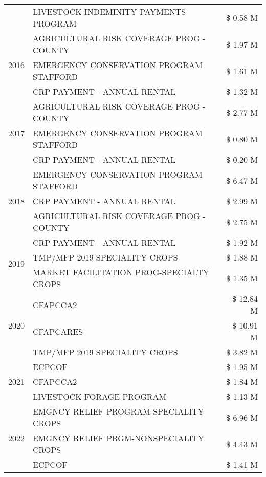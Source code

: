 \begin{tabular}{llr}
 & LIVESTOCK INDEMINITY PAYMENTS PROGRAM & \$ 0.58 M \\
\cline{1-3}
\multirow[t]{3}{*}{2016} & AGRICULTURAL RISK COVERAGE PROG - COUNTY & \$ 1.97 M \\
 & EMERGENCY CONSERVATION PROGRAM STAFFORD & \$ 1.61 M \\
 & CRP PAYMENT - ANNUAL RENTAL & \$ 1.32 M \\
\cline{1-3}
\multirow[t]{3}{*}{2017} & AGRICULTURAL RISK COVERAGE PROG - COUNTY & \$ 2.77 M \\
 & EMERGENCY CONSERVATION PROGRAM STAFFORD & \$ 0.80 M \\
 & CRP PAYMENT - ANNUAL RENTAL & \$ 0.20 M \\
\cline{1-3}
\multirow[t]{3}{*}{2018} & EMERGENCY CONSERVATION PROGRAM STAFFORD & \$ 6.47 M \\
 & CRP PAYMENT - ANNUAL RENTAL & \$ 2.99 M \\
 & AGRICULTURAL RISK COVERAGE PROG - COUNTY & \$ 2.75 M \\
\cline{1-3}
\multirow[t]{3}{*}{2019} & CRP PAYMENT - ANNUAL RENTAL & \$ 1.92 M \\
 & TMP/MFP 2019 SPECIALITY CROPS & \$ 1.88 M \\
 & MARKET FACILITATION PROG-SPECIALTY CROPS & \$ 1.35 M \\
\cline{1-3}
\multirow[t]{3}{*}{2020} & CFAPCCA2 & \$ 12.84 M \\
 & CFAPCARES & \$ 10.91 M \\
 & TMP/MFP 2019 SPECIALITY CROPS & \$ 3.82 M \\
\cline{1-3}
\multirow[t]{3}{*}{2021} & ECPCOF & \$ 1.95 M \\
 & CFAPCCA2 & \$ 1.84 M \\
 & LIVESTOCK FORAGE PROGRAM & \$ 1.13 M \\
\cline{1-3}
\multirow[t]{3}{*}{2022} & EMGNCY RELIEF PROGRAM-SPECIALITY CROPS & \$ 6.96 M \\
 & EMGNCY RELIEF PRGM-NONSPECIALITY CROPS & \$ 4.43 M \\
 & ECPCOF & \$ 1.41 M \\
\cline{1-3}
\bottomrule
\end{tabular}

